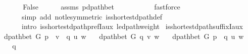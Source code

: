 \begin{isabellebody}
\ \ \ \ \isacommand{{\isachardot}{\kern0pt}}\isamarkupfalse%
\isanewline
\ \ \isamarkupfalse%
\ {\isachardoublequoteopen}False{\isachardoublequoteclose}\isanewline
\ \ \ \ \isamarkupfalse%
\ assms\ p{\isacharprime}{\kern0pt}{\isacharunderscore}{\kern0pt}dpath{\isacharunderscore}{\kern0pt}bet\isanewline
\ \ \ \ \isamarkupfalse%
\isanewline
\ \ \ \ \ \ {\isacharparenleft}{\kern0pt}fastforce\isanewline
\ \ \ \ \ \ \ \ simp\ add{\isacharcolon}{\kern0pt}\ not{\isacharunderscore}{\kern0pt}le{\isacharbrackleft}{\kern0pt}symmetric{\isacharbrackright}{\kern0pt}\ is{\isacharunderscore}{\kern0pt}shortest{\isacharunderscore}{\kern0pt}dpath{\isacharunderscore}{\kern0pt}def\isanewline
\ \ \ \ \ \ \ \ intro{\isacharcolon}{\kern0pt}\ is{\isacharunderscore}{\kern0pt}shortest{\isacharunderscore}{\kern0pt}dpath{\isacharunderscore}{\kern0pt}prefI{\isacharunderscore}{\kern0pt}aux{\isacharunderscore}{\kern0pt}{}\ {\isasymdelta}{\isacharunderscore}{\kern0pt}le{\isacharunderscore}{\kern0pt}dpath{\isacharunderscore}{\kern0pt}weight{\isacharparenright}{\kern0pt}\isanewline
{}\isamarkupfalse%
%
\endisatagproof
{\isafoldproof}%
%
\isadelimproof
\isanewline
%
\endisadelimproof
%
\isadeliminvisible
\isanewline
%
\endisadeliminvisible
%
\isataginvisible
{}\isamarkupfalse%
\ is{\isacharunderscore}{\kern0pt}shortest{\isacharunderscore}{\kern0pt}dpath{\isacharunderscore}{\kern0pt}suffixI{\isacharunderscore}{\kern0pt}aux{\isacharcolon}{\kern0pt}\isanewline
\ \ \ {\isachardoublequoteopen}dpath{\isacharunderscore}{\kern0pt}bet\ G\ {\isacharparenleft}{\kern0pt}p\ {\isacharat}{\kern0pt}\ {\isacharbrackleft}{\kern0pt}v{\isacharbrackright}{\kern0pt}\ {\isacharat}{\kern0pt}\ q{\isacharparenright}{\kern0pt}\ u\ w{\isachardoublequoteclose}\isanewline
\ \ \ {\isachardoublequoteopen}dpath{\isacharunderscore}{\kern0pt}bet\ G\ q{\isacharprime}{\kern0pt}\ v\ w{\isachardoublequoteclose}\isanewline
\ \ \ {\isachardoublequoteopen}dpath{\isacharunderscore}{\kern0pt}bet\ G\ {\isacharparenleft}{\kern0pt}p\ {\isacharat}{\kern0pt}\ q{\isacharprime}{\kern0pt}{\isacharparenright}{\kern0pt}\ u\ w{\isachardoublequoteclose}%
\endisataginvisible
{\isafoldinvisible}%
%
\isadeliminvisible
\isanewline
%
\endisadeliminvisible
%
\isadelimproof
%
\endisadelimproof
%
\isatagproof
{}\isamarkupfalse%
\ {\isacharminus}{\kern0pt}\isanewline
\ \ \isamarkupfalse%
\ q{\isacharprime}{\kern0pt}{\isacharprime}{\kern0pt}\ \isanewline

\end{isabellebody}
